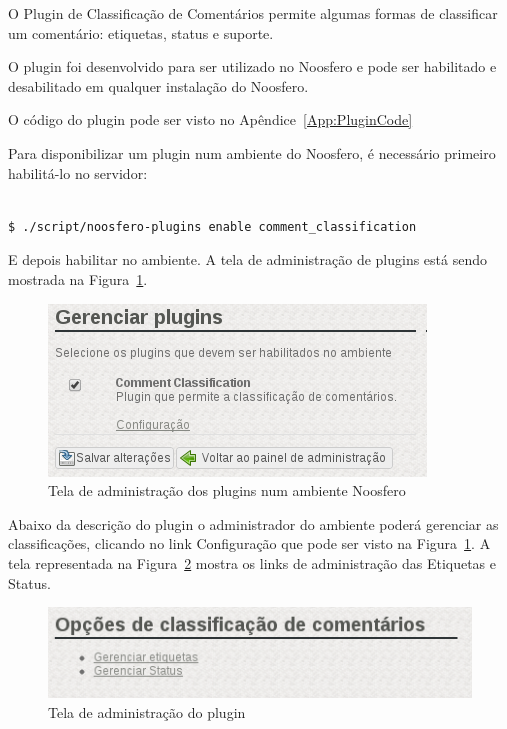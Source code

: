 \documentclass[11pt]{article}
\begin{document}
O Plugin de Classificação de Comentários permite algumas formas de
classificar um comentário: etiquetas, status e suporte.

O plugin foi desenvolvido para ser utilizado no Noosfero e pode ser
habilitado e desabilitado em qualquer instalação do Noosfero.

O código do plugin pode ser visto no Apêndice~\ref{App:PluginCode}

Para disponibilizar um plugin num ambiente do Noosfero, é necessário
primeiro habilitá-lo no servidor:

\begin{verbatim}

$ ./script/noosfero-plugins enable comment_classification

\end{verbatim}

E depois habilitar no ambiente. A tela de administração de plugins está
sendo mostrada na Figura~\ref{fig:environment-admin-page}.

\begin{figure}[h]
\center
\includegraphics[scale=0.6]{environment-admin-page.png}
\caption{Tela de administração dos plugins num ambiente Noosfero}
\label{fig:environment-admin-page}
\end{figure}

Abaixo da descrição do plugin o administrador do ambiente poderá
gerenciar as classificações, clicando no link Configuração que pode ser
visto na Figura~\ref{fig:environment-admin-page}. A tela representada na
Figura~\ref{fig:plugin-admin-page} mostra os links de administração das
Etiquetas e Status.

\begin{figure}[h]
\center
\includegraphics[scale=0.6]{plugin-admin-page.png}
\caption{Tela de administração do plugin}
\label{fig:plugin-admin-page}
\end{figure}
\end{document}
